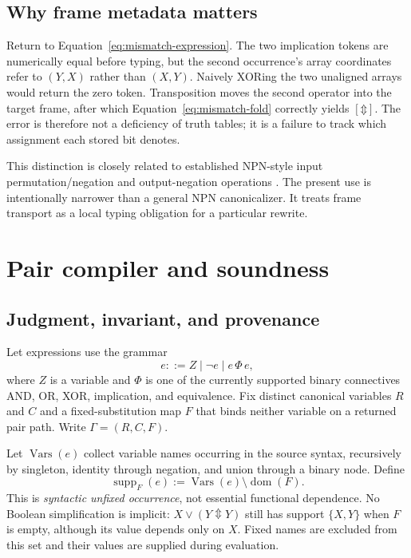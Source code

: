 \documentclass[10pt]{article}
\newcommand{\bxor}{\mathbin{\Updownarrow}}
\newcommand{\supp}{\operatorname{supp}}
\theoremstyle{plain}
\theoremstyle{definition}
\theoremstyle{remark}
\begin{document}
\subsection{Why frame metadata matters}

Return to Equation~\eqref{eq:mismatch-expression}. The two implication tokens are numerically equal before typing, but the second occurrence's array coordinates refer to $(Y,X)$ rather than $(X,Y)$. Naively XORing the two unaligned arrays would return the zero token. Transposition moves the second operator into the target frame, after which Equation~\eqref{eq:mismatch-fold} correctly yields $[\bxor]$. The error is therefore not a deficiency of truth tables; it is a failure to track which assignment each stored bit denotes.

This distinction is closely related to established NPN-style input permutation/negation and output-negation operations \cite{Mishchenko2006,Zhou2019}. The present use is intentionally narrower than a general NPN canonicalizer. It treats frame transport as a local typing obligation for a particular rewrite.

\section{Pair compiler and soundness}
\label{sec:compiler}

\subsection{Judgment, invariant, and provenance}

Let expressions use the grammar
\begin{equation}
 e ::= Z\mid \neg e\mid e\,\Phi\,e,
 \label{eq:grammar}
\end{equation}
where $Z$ is a variable and $\Phi$ is one of the currently supported binary connectives AND, OR, XOR, implication, and equivalence. Fix distinct canonical variables $R$ and $C$ and a fixed-substitution map $F$ that binds neither variable on a returned pair path. Write $\Gamma=(R,C,F)$.

Let $\operatorname{Vars}(e)$ collect variable names occurring in the source syntax, recursively by singleton, identity through negation, and union through a binary node. Define
\begin{equation}
 \supp_F(e):=\operatorname{Vars}(e)\setminus\operatorname{dom}(F).
 \label{eq:syntactic-support}
\end{equation}
This is \emph{syntactic unfixed occurrence}, not essential functional dependence. No Boolean simplification is implicit: $X\lor(Y\bxor Y)$ still has support $\{X,Y\}$ when $F$ is empty, although its value depends only on $X$. Fixed names are excluded from this set and their values are supplied during evaluation.
\end{document}
